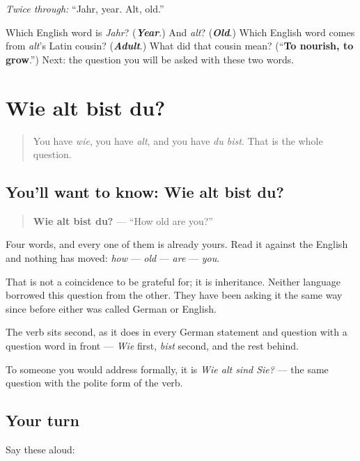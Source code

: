 \emph{Twice through:} \textquotedblleft{}Jahr, year. Alt, old.\textquotedblright{}

\begin{tcolorbox}[breakable,colback=teal!4,colframe=teal!35!black,title={Before you move on}]
Which English word is \emph{Jahr}? (\emph{\textbf{Year}}.) And \emph{alt}? (\emph{\textbf{Old}}.) Which English word comes from \emph{alt}'s Latin cousin? (\emph{\textbf{Adult}}.) What did that cousin mean? (\textquotedblleft{}\textbf{To nourish, to grow}.\textquotedblright{}) Next: the question you will be asked with these two words.
\end{tcolorbox}
\section[Wie alt bist du?]{Wie alt bist du?}

\label{lesson:GE-C14-wie-alt-bist-du}



\begin{quote}
You have \emph{wie}, you have \emph{alt}, and you have \emph{du bist}. That is the whole question.
\end{quote}

\subsection*{You'll want to know: Wie alt bist du?}
\begin{quote}
\textbf{Wie alt bist du?} — \textquotedblleft{}How old are you?\textquotedblright{}
\end{quote}

Four words, and every one of them is already yours. Read it against the English and nothing has moved: \emph{how} — \emph{old} — \emph{are} — \emph{you}.

That is not a coincidence to be grateful for; it is inheritance. Neither language borrowed this question from the other. They have been asking it the same way since before either was called German or English.

The verb sits second, as it does in every German statement and question with a question word in front — \emph{Wie} first, \emph{bist} second, and the rest behind.

To someone you would address formally, it is \emph{Wie alt sind Sie?} — the same question with the polite form of the verb.

\subsection*{Your turn}
Say these aloud:

